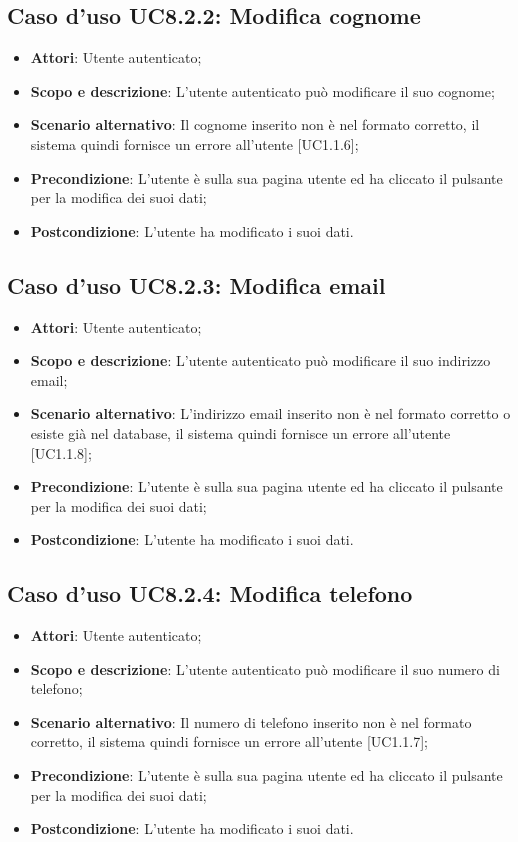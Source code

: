 \documentclass[12pt,a4paper,titlepage]{article}
\begin{document}
	\subsection{Caso d'uso UC8.2.2: Modifica cognome}
	\label{UC8.2.2}
	\begin{itemize}
		\item \textbf{Attori}: Utente autenticato;
		\item \textbf{Scopo e descrizione}: L'utente autenticato può modificare il suo cognome;
		\item \textbf{Scenario alternativo}: Il cognome inserito non è nel formato corretto, il sistema quindi fornisce un errore all'utente [UC1.1.6];
		\item \textbf{Precondizione}: L'utente è sulla sua pagina utente ed ha cliccato il pulsante per la modifica dei suoi dati;
		\item \textbf{Postcondizione}: L'utente ha modificato i suoi dati.
	\end{itemize}
	\subsection{Caso d'uso UC8.2.3: Modifica email}
	\label{UC8.2.3}
	\begin{itemize}
		\item \textbf{Attori}: Utente autenticato;
		\item \textbf{Scopo e descrizione}: L'utente autenticato può modificare il suo indirizzo email;
		\item \textbf{Scenario alternativo}: L'indirizzo email inserito non è nel formato corretto o esiste già nel database, il sistema quindi fornisce un errore all'utente [UC1.1.8];
		\item \textbf{Precondizione}: L'utente è sulla sua pagina utente ed ha cliccato il pulsante per la modifica dei suoi dati;
		\item \textbf{Postcondizione}: L'utente ha modificato i suoi dati.
	\end{itemize}
	\subsection{Caso d'uso UC8.2.4: Modifica telefono}
	\label{UC8.2.4}
	\begin{itemize}
		\item \textbf{Attori}: Utente autenticato;
		\item \textbf{Scopo e descrizione}: L'utente autenticato può modificare il suo numero di telefono;
		\item \textbf{Scenario alternativo}: Il numero di telefono inserito non è nel formato corretto, il sistema quindi fornisce un errore all'utente [UC1.1.7];
		\item \textbf{Precondizione}: L'utente è sulla sua pagina utente ed ha cliccato il pulsante per la modifica dei suoi dati;
		\item \textbf{Postcondizione}: L'utente ha modificato i suoi dati.
	\end{itemize}
\end{document}
